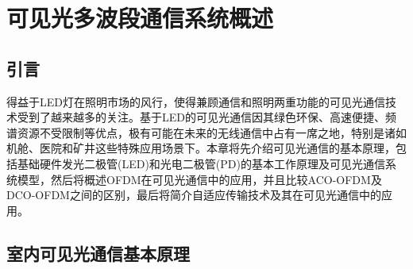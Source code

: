 \chapter{可见光多波段通信系统概述}
\section{引言}
得益于LED灯在照明市场的风行，使得兼顾通信和照明两重功能的可见光通信技术受到了越来越多的关注。基于LED的可见光通信因其绿色环保、高速便捷、频谱资源不受限制等优点，极有可能在未来的无线通信中占有一席之地，特别是诸如机舱、医院和矿井这些特殊应用场景下。本章将先介绍可见光通信的基本原理，包括基础硬件发光二极管(LED)和光电二极管(PD)的基本工作原理及可见光通信系统模型，然后将概述OFDM在可见光通信中的应用，并且比较ACO-OFDM及DCO-OFDM之间的区别，最后将简介自适应传输技术及其在可见光通信中的应用。
\section{室内可见光通信基本原理}
